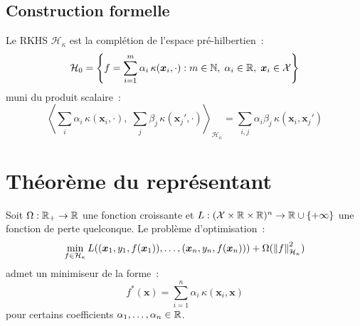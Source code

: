 \subsection{Construction formelle}

\begin{proposition}
\label{prop:rkhs-construction}
Le RKHS $\mathcal{H}_\kappa$ est la compl\'etion de l'espace
pr\'e-hilbertien~:
\begin{equation}
  \mathcal{H}_0 = \left\{f = \sum_{i=1}^m \alpha_i\,
  \kappa(\bm{x}_i, \cdot) : m \in \mathbb{N},\;
  \alpha_i \in \mathbb{R},\; \bm{x}_i \in \mathcal{X}\right\}
\end{equation}
muni du produit scalaire~:
\begin{equation}
  \left\langle \sum_{i} \alpha_i\, \kappa(\bm{x}_i, \cdot),\;
  \sum_{j} \beta_j\, \kappa(\bm{x}_j', \cdot)
  \right\rangle_{\mathcal{H}_\kappa}
  = \sum_{i,j} \alpha_i \beta_j\, \kappa(\bm{x}_i, \bm{x}_j')
\end{equation}
\end{proposition}

\section{Th\'eor\`eme du repr\'esentant}
\label{sec:representer}

\begin{theoreme}
\label{thm:representer}
Soit $\Omega : \mathbb{R}_+ \to \mathbb{R}$ une fonction croissante et
$L : (\mathcal{X} \times \mathbb{R} \times \mathbb{R})^n \to \mathbb{R} \cup \{+\infty\}$ une
fonction de perte quelconque. Le probl\`eme d'optimisation~:
\begin{equation}
  \min_{f \in \mathcal{H}_\kappa} L\!\left((\bm{x}_1, y_1, f(\bm{x}_1)),
  \ldots, (\bm{x}_n, y_n, f(\bm{x}_n))\right)
  + \Omega(\left\| f \right\|^2_{\mathcal{H}_\kappa})
  \label{eq:representer-problem}
\end{equation}
admet un minimiseur de la forme~:
\begin{equation}
  f^*(\bm{x}) = \sum_{i=1}^n \alpha_i\, \kappa(\bm{x}_i, \bm{x})
  \label{eq:representer-solution}
\end{equation}
pour certains coefficients $\alpha_1, \ldots, \alpha_n \in \mathbb{R}$.
\end{theoreme}

